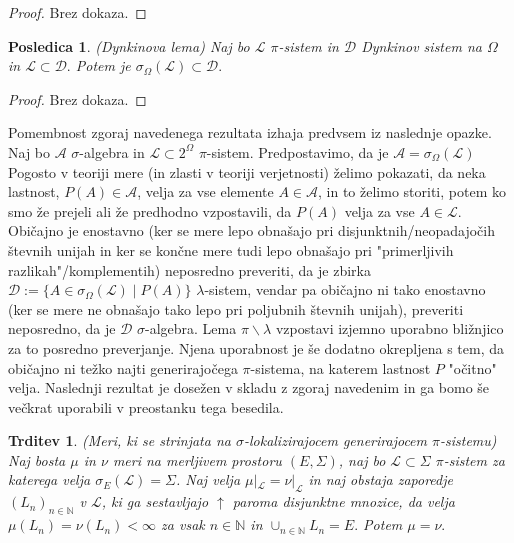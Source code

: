 \documentclass[a4paper,12pt]{article}
\theoremstyle{definition} %
\theoremstyle{plain} %
\newtheorem{trditev}[definicija]{Trditev}
\newtheorem{posledica}[definicija]{Posledica}
\newcommand{\N}{\mathbb{N}}
\newcommand{\A}{\mathcal{A}}
\begin{document}
            \begin{proof}
                Brez dokaza.
            \end{proof}

            \begin{posledica}(Dynkinova lema)
                Naj bo $\mathcal{L}$ $\pi$-sistem in $\mathcal{D}$ Dynkinov sistem na $\Omega$ in $\mathcal{L} \subset \mathcal{D}.$ Potem je $\sigma_{\Omega}(\mathcal{L}) \subset \mathcal{D}.$
                
            \end{posledica}

            \begin{proof}
                Brez dokaza.
            \end{proof}

            Pomembnost zgoraj navedenega rezultata izhaja predvsem iz naslednje opazke. 
            Naj bo $\A$ $\sigma$-algebra in $\mathcal{L}\subset 2^{\Omega}$ $\pi$-sistem. Predpostavimo, da je $\A = \sigma_{\Omega}(\mathcal{L})$ 
            Pogosto v teoriji mere (in zlasti v teoriji verjetnosti) želimo pokazati,
             da neka lastnost, $P(A) \in \A$, velja za vse elemente 
             $A\in\A$, in to želimo storiti, potem ko smo že prejeli ali že predhodno 
             vzpostavili, da $P(A)$ velja za vse $A\in\mathcal{L}$. Običajno je enostavno 
             (ker se mere lepo obnašajo pri disjunktnih/neopadajočih števnih unijah 
             in ker se končne mere tudi lepo obnašajo pri "primerljivih razlikah"/komplementih) 
             neposredno preveriti, da je zbirka $\mathcal{D}:= \{A\in\sigma_{\Omega}(\mathcal{L})\mid P(A)\}$ $\lambda$-sistem, vendar pa 
             običajno ni tako enostavno (ker se mere ne obnašajo tako lepo pri poljubnih števnih 
             unijah), preveriti neposredno, da je $\mathcal{D}$ $\sigma$-algebra. Lema $\pi\backslash\lambda$ vzpostavi izjemno uporabno 
             bližnjico za to posredno preverjanje. Njena uporabnost je še dodatno okrepljena s tem, 
             da običajno ni težko najti generirajočega $\pi$-sistema, na katerem lastnost $P$ "očitno" velja.
              Naslednji rezultat je dosežen v skladu z zgoraj navedenim in ga bomo še večkrat uporabili
             v preostanku tega besedila.

            \begin{trditev}(Meri, ki se strinjata na $\sigma$-lokalizirajocem generirajocem $\pi$-sistemu)
                Naj bosta $\mu$ in $\nu$ meri na merljivem prostoru $(E, \Sigma)$, naj bo $\mathcal{L} \subset \Sigma$ $\pi$-sistem za katerega
                velja $\sigma_{E}(\mathcal{L}) = \Sigma$. Naj velja $\mu|_\mathcal{L} = \nu|_\mathcal{L}$ in naj obstaja 
                zaporedje $(L_n)_{n\in\N}$ v $\mathcal{L}$, ki ga sestavljajo $\uparrow$ paroma disjunktne mnozice,
                da velja $\mu(L_n) = \nu(L_n) < \infty$ za vsak $n\in\N$ in $\cup_{n\in\N}L_n = E.$ Potem $\mu = \nu.$
            \end{trditev}
\end{document}
